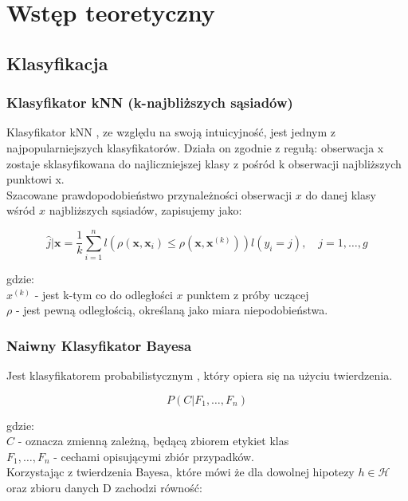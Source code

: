 \section{Wstęp teoretyczny}
\subsection{Klasyfikacja}
\subsubsection{Klasyfikator kNN (k-najbliższych sąsiadów)}
Klasyfikator kNN \cite{wyklad}, ze względu na swoją intuicyjność, jest jednym z najpopularniejszych klasyfikatorów. Działa on zgodnie z regułą: obserwacja x zostaje sklasyfikowana do najliczniejszej klasy z pośród k obserwacji najbliższych punktowi x.\\

Szacowane prawdopodobieństwo przynależności obserwacji ${x}$ do danej klasy wśród ${x}$ najbliższych sąsiadów, zapisujemy jako:

\begin{equation}
    \hat{j}|\mathbf{x} = \frac{1}{k} \sum_{i=1}^{n} l\left( \rho(\mathbf{x}, \mathbf{x}_i) \leq \rho(\mathbf{x}, \mathbf{x}^{(k)}) \right) l(y_i = j), \quad j = 1, \ldots, g
\end{equation}

gdzie:\\
${x}^{(k)}$ - jest k-tym co do odległości ${x}$ punktem z próby uczącej\\
$\rho$ - jest pewną odległością, określaną jako miara niepodobieństwa.

\subsubsection{Naiwny Klasyfikator Bayesa}
Jest klasyfikatorem probabilistycznym \cite{wyklad}, który opiera się na użyciu twierdzenia.

\begin{equation}
P(C|F_1, \ldots, F_n)
\end{equation}

gdzie:\\
$C$ - oznacza zmienną zależną, będącą zbiorem etykiet klas\\
 $F_1, \ldots, F_n$ - cechami opisującymi zbiór przypadków.\\

 Korzystając z twierdzenia Bayesa, które mówi że dla dowolnej hipotezy $h \in \mathcal{H}$ oraz zbioru danych D zachodzi równość:

